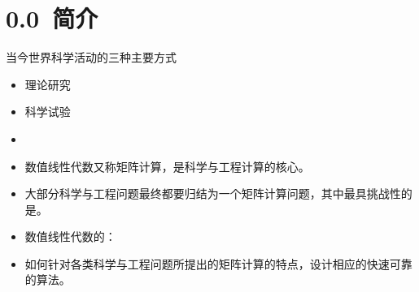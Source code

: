 \section{0.0~简介}
\begin{frame}\ft{\secname}
\begin{small}
当今世界科学活动的三种主要方式\\
\begin{itemize}
\item
理论研究\\[0.2cm]
\item
科学试验\\[0.2cm]
\item
{}
\end{itemize}
\end{small}
\end{frame}

\begin{frame}\ft{\secname}
\begin{small}
\begin{itemize}
\item
数值线性代数又称矩阵计算，是科学与工程计算的核心。 \\[0.2cm]
\item
大部分科学与工程问题最终都要归结为一个矩阵计算问题，其中最具挑战性的是。 \\[0.2cm]
\item
数值线性代数的：
\item[]
如何针对各类科学与工程问题所提出的矩阵计算的特点，设计相应的快速可靠的算法。
\end{itemize}
\end{small}
\end{frame}